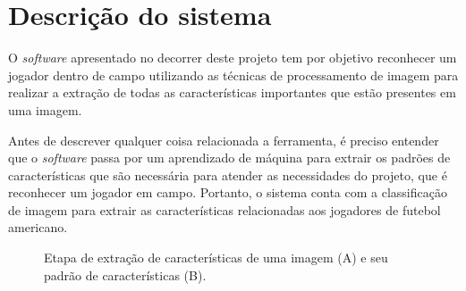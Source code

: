 \section{\textbf{Descrição do sistema}}
\label{descricao-do-sistema}


O \textit{software} apresentado no decorrer deste projeto tem por objetivo reconhecer um jogador dentro de campo utilizando as técnicas de processamento de imagem para realizar a extração de todas as características importantes que estão presentes em uma imagem.

Antes de descrever qualquer coisa relacionada a ferramenta, é preciso entender que o \textit{software} passa por um aprendizado de máquina para extrair os padrões de características que são necessária para atender as necessidades do projeto, que é reconhecer um jogador em campo. Portanto, o sistema conta com a classificação de imagem para extrair as características relacionadas aos jogadores de futebol americano.

\begin{figure}[h]
	\caption{\label{fig_conversao_img}Etapa de extração de características de uma imagem (A) e seu padrão de características (B).}
	\begin{center}
	\end{center}
	\centering {}
\end{figure}


